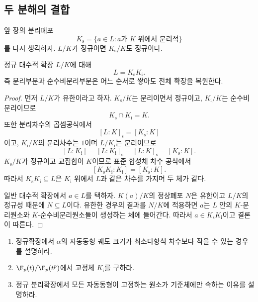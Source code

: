 \subsection{두 분해의 결합}

앞 장의 분리폐포
\[
  K_{\mathrm s}=\{a\in L:a\text{가 }K\text{ 위에서 분리적}\}
\]
를 다시 생각하자. $L/K$가 정규이면 $K_{\mathrm s}/K$도 정규이다.

\begin{theorem}
정규 대수적 확장 $L/K$에 대해
\[
  L=K_{\mathrm s}K_{\mathrm i}.
\]
즉 분리부분과 순수비분리부분은 어느 순서로 쌓아도 전체 확장을 복원한다.
\end{theorem}

\begin{proof}
먼저 $L/K$가 유한이라고 하자. $K_{\mathrm s}/K$는 분리이면서 정규이고, $K_{\mathrm i}/K$는 순수비분리이므로
\[
  K_{\mathrm s}\cap K_{\mathrm i}=K.
\]
또한 분리차수의 곱셈공식에서
\[
  [L:K]_{\mathrm s}=[K_{\mathrm s}:K]
\]
이고, $K_{\mathrm i}/K$의 분리차수는 $1$이며 $L/K_{\mathrm i}$는 분리이므로
\[
  [L:K_{\mathrm i}]
  =[L:K_{\mathrm i}]_{\mathrm s}
  =[L:K]_{\mathrm s}
  =[K_{\mathrm s}:K].
\]
$K_{\mathrm s}/K$가 정규이고 교집합이 $K$이므로 표준 합성체 차수 공식에서
\[
  [K_{\mathrm s}K_{\mathrm i}:K_{\mathrm i}]
  =[K_{\mathrm s}:K].
\]
따라서 $K_{\mathrm s}K_{\mathrm i}\subseteq L$은 $K_{\mathrm i}$ 위에서 $L$과 같은 차수를 가지며 두 체가 같다.

일반 대수적 확장에서 $a\in L$를 택하자. $K(a)/K$의 정상폐포 $N$은 유한이고 $L/K$의 정규성 때문에 $N\subseteq L$이다. 유한한 경우의 결과를 $N/K$에 적용하면 $a$는 $L$ 안의 $K$-분리원소와 $K$-순수비분리원소들이 생성하는 체에 들어간다. 따라서 $a\in K_{\mathrm s}K_{\mathrm i}$이고 결론이 따른다.
\end{proof}

\begin{checkpoint}
\begin{enumerate}[label=(\alph*)]
  \item 정규확장에서 $\alpha$의 자동동형 궤도 크기가 최소다항식 차수보다 작을 수 있는 경우를 설명하라.
  \item $\F_p(t)/\F_p(t^p)$에서 고정체 $K_{\mathrm i}$를 구하라.
  \item 정규 분리확장에서 모든 자동동형이 고정하는 원소가 기준체에만 속하는 이유를 설명하라.
\end{enumerate}
\end{checkpoint}
